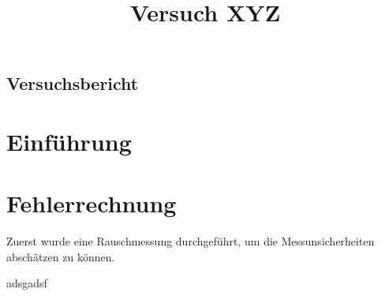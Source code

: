 \documentclass[]{article}
\title{Versuch XYZ}
\begin{document}
	\begin{center}
		\section*{Versuchsbericht}
	\end{center}
\section{Einführung}
\section{Fehlerrechnung}
Zuerst wurde eine Rauschmessung durchgeführt, um die Messunsicherheiten abschätzen zu können.

adsgadsf
\end{document}
